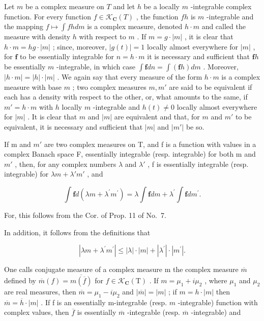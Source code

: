 Let \(m\) be a complex measure on \(T\) and let \(h\) be a locally \(m\) -integrable complex function. For every function \(f \in \mathcal{K}_{\mathbf{C}}(T)\) , the function \(fh\) is \(m\) -integrable and the mapping \(f \mapsto \int fh dm\) is a complex measure, denoted \(h \cdot m\) and called the measure with density \(h\) with respect to \(m\) . If \(m = g \cdot |m|\) , it is clear that \(h \cdot m = hg \cdot |m|\) ; since, moreover, \(|g(t)| = 1\) locally almost everywhere for \(|m|\) , for \(\mathbf{f}\) to be essentially integrable for \(n = h \cdot m\) it is necessary and sufficient that \(\mathbf{f}h\) be essentially \(m\) -integrable, in which case \(\int \mathbf{f} dn = \int (\mathbf{f}h) dm\) . Moreover, \(|h \cdot m| = |h| \cdot |m|\) . We again say that every measure of the form \(h \cdot m\) is a complex measure with base \(m\) ; two complex measures \(m, m'\) are said to be equivalent if each has a density with respect to the other, or, what amounts to the same, if \(m' = h \cdot m\) with \(h\) locally \(m\) -integrable and \(h(t) \neq 0\) locally almost everywhere for \(|m|\) . It is clear that \(m\) and \(|m|\) are equivalent and that, for \(m\) and \(m'\) to be equivalent, it is necessary and sufficient that \(|m|\) and \(|m'|\) be so.

If m and \(m'\) are two complex measures on T, and f is a function with values in a complex Banach space F, essentially integrable (resp. integrable) for both m and \(m'\) , then, for any complex numbers \(\lambda\) and \(\lambda'\) , f is essentially integrable (resp. integrable) for \(\lambda m + \lambda'm'\) , and

\[
\int \mathbf {f} d (\lambda m + \lambda^ {\prime} m ^ {\prime}) = \lambda \int \mathbf {f} d m + \lambda^ {\prime} \int \mathbf {f} d m ^ {\prime}.
\]

For, this follows from the Cor. of Prop. 11 of No.~7.

In addition, it follows from the definitions that

\[
\left| \lambda m + \lambda^ {\prime} m ^ {\prime} \right| \leqslant \left| \lambda \right| \cdot \left| m \right| + \left| \lambda^ {\prime} \right| \cdot \left| m ^ {\prime} \right|.
\]

One calls conjugate measure of a complex measure m the complex measure \(\overline{m}\) defined by \(\overline{m}(f) = \overline{m(\overline{f})}\) for \(f \in \mathcal{K}_{\mathbf{C}}(\mathrm{T})\) . If \(m = \mu_{1} + i\mu_{2}\) , where \(\mu_{1}\) and \(\mu_{2}\) are real measures, then \(\overline{m} = \mu_{1} - i\mu_{2}\) and \(|\overline{m}| = |m|\) ; if \(m = h \cdot |m|\) then \(\overline{m} = \overline{h} \cdot |m|\) . If f is an essentially m-integrable (resp. \(m\) -integrable) function with complex values, then \(\overline{f}\) is essentially \(\overline{m}\) -integrable (resp. \(\overline{m}\) -integrable) and

